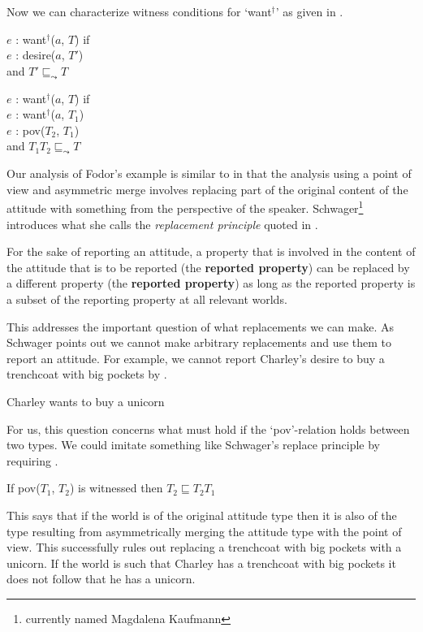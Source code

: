 Now we can characterize witness conditions for `want$^{\dagger}$' as
given in \nexteg{}.
\begin{ex} 
$e$ : want$^{\dagger}$($a$, $T$) if\\
\hspace*{2em} $e$ : desire($a$, $T'$) \\
\hspace*{2em} and $T'\sqsubseteq_{\leadsto}T$

$e$ : want$^{\dagger}$($a$, $T$) if\\
\hspace*{2em} $e$ : want$^{\dagger}$($a$, $T_1$)\\
\hspace*{2em} $e$ : pov($T_2$, $T_1$) \\
\hspace*{2em} and $T_1$\fbox{\d{$\wedge$}}$T_2
\sqsubseteq_{\leadsto}T$
\label{ex:wantdagger-witcond}
\end{ex} 
      
Our analysis of Fodor's example is similar to \cite{Schwager2009} in
that the analysis using a point of view and asymmetric merge involves
replacing part of the original content of the attitude with something
from the perspective of the speaker.  Schwager\footnote{currently
  named Magdalena Kaufmann} introduces what she calls the
\textit{replacement principle} quoted in \nexteg{}.
\begin{ex} 
For the sake of reporting an attitude, a property that is involved in
the content of the attitude that is to be reported (the
\textbf{reported property}) can be replaced by a different property
(the \textbf{reported property}) as long as the reported property is a
subset of the reporting property at all relevant worlds. 

\hfill\cite[p. 409]{Schwager2009} 
\end{ex} 
This addresses the important question of what replacements we can
make.  As Schwager points out we cannot make arbitrary replacements
and use them to report an attitude.  For example, we cannot report
Charley's desire to buy a trenchcoat with big pockets by \nexteg{}.
\begin{ex} 
Charley wants to buy a unicorn 
\end{ex} 
For us, this question concerns what must hold if the `pov'-relation
holds between two types.  We could imitate something like Schwager's
replace principle by requiring \nexteg{}.
\begin{ex} 
If pov($T_1$, $T_2$) is witnessed then $T_2\sqsubseteq T_2$\fbox{\d{$\wedge$}}$T_1$ 
\end{ex} 
This says that if the world is of the original attitude type then it
is also of the type resulting from asymmetrically merging the attitude
type with the point of view.  This successfully rules out replacing a
trenchcoat with big pockets with a unicorn.  If the world is such that
Charley has a trenchcoat with big pockets it does not follow that he
has a unicorn.

